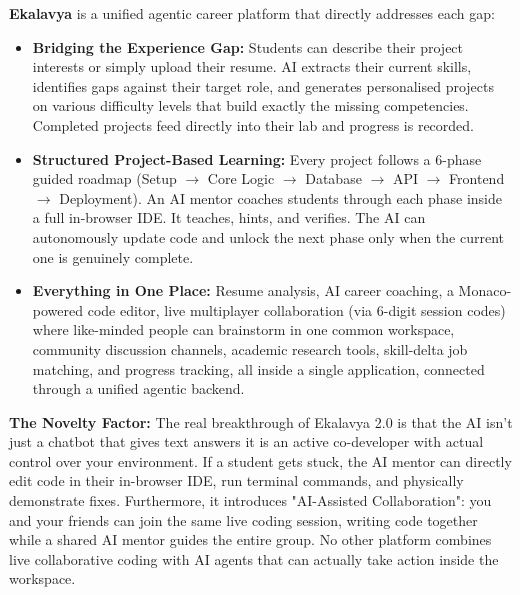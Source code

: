 \documentclass[11pt, a4paper]{article}
\begin{document}
\textbf{Ekalavya} is a unified agentic career platform that directly addresses each gap:

\begin{itemize}[leftmargin=1.5em, itemsep=2pt]
    \item \textbf{Bridging the Experience Gap:} Students can describe their project interests or simply upload their resume. AI extracts their current skills, identifies gaps against their target role, and generates personalised projects on various difficulty levels that build exactly the missing competencies. Completed projects feed directly into their lab and progress is recorded.

    \item \textbf{Structured Project-Based Learning:} Every project follows a 6-phase guided roadmap (Setup $\rightarrow$ Core Logic $\rightarrow$ Database $\rightarrow$ API $\rightarrow$ Frontend $\rightarrow$ Deployment). An AI mentor coaches students through each phase inside a full in-browser IDE. It teaches, hints, and verifies. The AI can autonomously update code and unlock the next phase only when the current one is genuinely complete.

    \item \textbf{Everything in One Place:} Resume analysis, AI career coaching, a Monaco-powered code editor, live multiplayer collaboration (via 6-digit session codes) where like-minded people can brainstorm in one common workspace, community discussion channels, academic research tools, skill-delta job matching, and progress tracking, all inside a single application, connected through a unified agentic backend.
\end{itemize}

\vspace{6pt}
\noindent\textbf{The Novelty Factor:} The real breakthrough of Ekalavya 2.0 is that the AI isn't just a chatbot that gives text answers it is an active co-developer with actual control over your environment. If a student gets stuck, the AI mentor can directly edit code in their in-browser IDE, run terminal commands, and physically demonstrate fixes. Furthermore, it introduces "AI-Assisted Collaboration": you and your friends can join the same live coding session, writing code together while a shared AI mentor guides the entire group. No other platform combines live collaborative coding with AI agents that can actually take action inside the workspace.

\newpage

\end{document}
